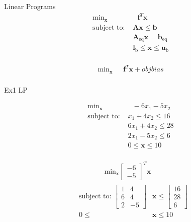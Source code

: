 \documentclass{article}
\begin{document}
Linear Programs
\begin{align*}
    \text{min}_{\mathbf{x}}& \text{ } \mathbf{f}^T \mathbf{x} \\
    \mbox{subject to: }& \mathbf{A}\mathbf{x} \le \mathbf{b}\\
                       & \mathbf{A}_{\text{eq}}\mathbf{x} =  \mathbf{b}_{\text{eq}}\\
                       & \mathbf{l}_{\text{b}} \le \mathbf{x} \le \mathbf{u}_{\text{b}}\\
\end{align*}

\begin{align*}
    \text{min}_{\mathbf{x}}& \text{ } \mathbf{f}^T \mathbf{x} + objbias\\
\end{align*}

Ex1 LP

\begin{align*}
    \text{min}_{\mathbf{x}}& \text{ } -6x_1 - 5x_2 \\
    \mbox{subject to: } & x_1 + 4x_2 \le 16\\
                        & 6x_1 + 4x_2 \le 28\\
                        & 2x_1 - 5x_2 \le 6\\
                       & 0 \le \mathbf{x} \le 10\\
\end{align*}

\begin{align*}
    &\qquad \qquad \text{min}_{\mathbf{x}}  \begin{bmatrix} -6 \\ -5 \end{bmatrix}^T \mathbf{x} \\
    &\begin{aligned}
    \mbox{subject to: } \begin{bmatrix} 1 & 4 \\ 6 & 4 \\ 2 & -5 \end{bmatrix} &\mathbf{x} \le \begin{bmatrix} 16 \\ 28 \\ 6 \end{bmatrix} \\
                        0 \le &\mathbf{x} \le 10
    \end{aligned}
\end{align*}
\end{document}
